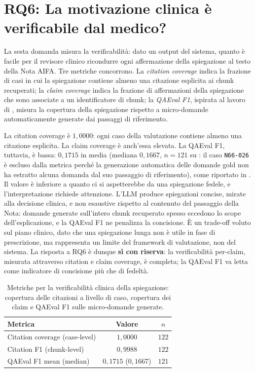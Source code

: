 \section{RQ6: La motivazione clinica è verificabile dal medico?}
\label{sec:rq6}

La sesta domanda misura la verificabilità: dato un output del sistema, quanto è facile per il revisore clinico ricondurre ogni affermazione della spiegazione al testo della Nota AIFA. Tre metriche concorrono. La \emph{citation coverage} indica la frazione di casi in cui la spiegazione contiene almeno una citazione esplicita ai chunk recuperati; la \emph{claim coverage} indica la frazione di affermazioni della spiegazione che sono associate a un identificatore di chunk; la \emph{QAEval F1}, ispirata al lavoro di \citet{deutsch2021qaeval}, misura la copertura della spiegazione rispetto a micro-domande automaticamente generate dai passaggi di riferimento.

La citation coverage è $1{,}0000$: ogni caso della valutazione contiene almeno una citazione esplicita. La claim coverage è anch'essa elevata. La QAEval F1, tuttavia, è bassa: $0{,}1715$ in media (mediana $0{,}1667$, $n=121$ su \goldn: il caso \texttt{N66-026} è escluso dalla metrica perché la generazione automatica delle domande gold non ha estratto alcuna domanda dal suo passaggio di riferimento), come riportato in . Il valore è inferiore a quanto ci si aspetterebbe da una spiegazione fedele, e l'interpretazione richiede attenzione. L'LLM produce spiegazioni concise, mirate alla decisione clinica, e non esaustive rispetto al contenuto del passaggio della Nota: domande generate sull'intero chunk recuperato spesso eccedono lo scope dell'esplicazione, e la QAEval F1 ne penalizza la concisione. È un trade-off voluto sul piano clinico, dato che una spiegazione lunga non è utile in fase di prescrizione, ma rappresenta un limite del framework di valutazione, non del sistema. La risposta a RQ6 è dunque \textbf{sì con riserva}: la verificabilità per-claim, misurata attraverso citation e claim coverage, è completa; la QAEval F1 va letta come indicatore di concisione più che di fedeltà.

\begin{table}[t]
  \centering
  \caption{Metriche per la verificabilità clinica della spiegazione: copertura delle citazioni a livello di caso, copertura dei claim e QAEval F1 sulle micro-domande generate.}
  \label{tab:rq6}
  \small
  \begin{tabular}{lcc}
    \toprule
    Metrica & Valore & $n$ \\
    \midrule
    Citation coverage (case-level) & $1{,}0000$ & $122$ \\
    Citation F1 (chunk-level)      & $0{,}9988$ & $122$ \\
    QAEval F1 mean (median)        & $0{,}1715$ ($0{,}1667$) & $121$ \\
    \bottomrule
  \end{tabular}
\end{table}

